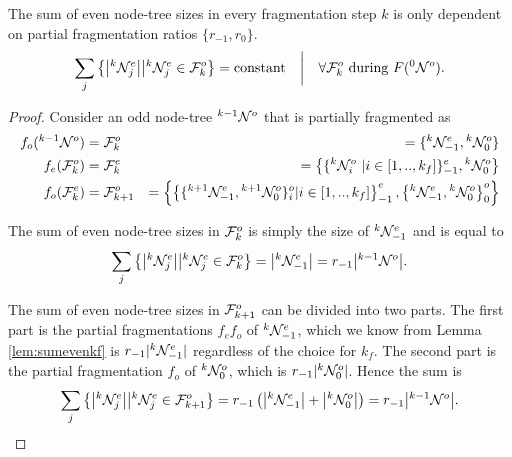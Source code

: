 \begin{lemma}\label{lem:equalevensum}
  The sum of even node-tree sizes in every fragmentation step $k$ is only dependent on partial fragmentation ratios $\{r_{-1}, r_0\}$. 
  \begin{equation}\label{eq:equalevensum}
    \sum_j{ \left\{ \abs{{}^{k}\mathcal{N}_j^e} \big| {}^{k}\mathcal{N}_j^e \in \mathcal{F}^o_k \right\} } = \text{constant}
  \hspace{1em} \bigg| \hspace{1em} \forall \mathcal{F}_k^o \text{ during } F({}^{0}\mathcal{N}^o).
  \end{equation}
\end{lemma}
\begin{proof}
  Consider an odd node-tree ${}^{k-1}\mathcal{N}^o$ that is partially fragmented as 
  \begin{eqnarray*}
    f_o({}^{k-1}\mathcal{N}^o) &= \mathcal{F}^o_k      &= \{{}^{k}\mathcal{N}^e_{-1}, {}^{k}\mathcal{N}^o_0 \} \\
    f_e(\mathcal{F}^o_k)        &= \mathcal{F}^e_k      &= \left\{ \{{}^{k}\mathcal{N}^o_i\ | i \in [1,..,k_f] \}^e_{-1}, {}^{k}\mathcal{N}^{o}_0 \right\} \\
    f_o(\mathcal{F}^e_k )       &= \mathcal{F}^o_{k+1}  &= \left\{ \left\{ \{{}^{k+1}\mathcal{N}^e_{-1}, {}^{k+1}\mathcal{N}^o_0\}_i^o | i \in [1,..,k_f] \right\}^e_{-1}, \left\{{}^{k}\mathcal{N}^e_{-1}, {}^{k}\mathcal{N}^o_0 \right\}^{o}_0 \right\}
  \end{eqnarray*}

  The sum of even node-tree sizes in $\mathcal{F}^o_k$ is simply the size of ${}^{k}\mathcal{N}^e_{-1}$ and is equal to
  \begin{equation*}
    \sum_j{ \left\{ \abs{{}^{k}\mathcal{N}_j^e} \big| {}^{k}\mathcal{N}_j^e \in \mathcal{F}^o_k \right\} } = \abs{{}^{k}\mathcal{N}^e_{-1}} = r_{-1}\abs{{}^{k-1}\mathcal{N}^o}. 
  \end{equation*}

  The sum of even node-tree sizes in $\mathcal{F}^o_{k+1}$ can be divided into two parts. The first part is the partial fragmentations $f_e f_o$ of ${}^{k}\mathcal{N}^e_{-1}$, which we know from Lemma \ref{lem:sumevenkf} is $r_{-1}|{}^{k}\mathcal{N}^e_{-1}|$ regardless of the choice for $k_f$. The second part is the partial fragmentation $f_o$ of ${}^{k}\mathcal{N}^o_0$, which is $r_{-1}|{}^{k}\mathcal{N}^o_0|$. Hence the sum is
  \begin{equation*}
    \sum_j{ \left\{ \abs{{}^{k}\mathcal{N}_j^e} \big| {}^{k}\mathcal{N}_j^e \in \mathcal{F}^o_{k+1} \right\} } = r_{-1} \left( \abs{{}^{k}\mathcal{N}^e_{-1}} + \abs{{}^{k}\mathcal{N}^o_0} \right) = r_{-1}\abs{{}^{k-1}\mathcal{N}^o}. 
  \end{equation*}
\end{proof}

